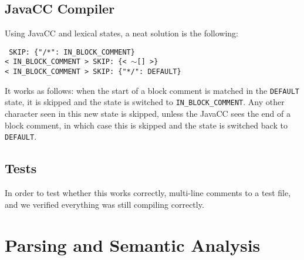 \documentclass[11pt]{article}
\begin{document}
\subsection{JavaCC Compiler}
Using JavaCC and lexical states, a neat solution is the following:

\noindent\texttt{
SKIP: \{"/*": IN\_BLOCK\_COMMENT\}\\
< IN\_BLOCK\_COMMENT > SKIP: \{< \(\sim\)[] >\}\\
< IN\_BLOCK\_COMMENT > SKIP: \{"*/": DEFAULT\}}

It works as follows: when the start of a block comment is matched in the  \texttt{DEFAULT} state, it is skipped and the state is switched to \texttt{IN\_BLOCK\_COMMENT}.
Any other character seen in this new state is skipped, unless the JavaCC sees the end of a block comment, in which case this is skipped and the state is switched back to \texttt{DEFAULT}.

\subsection{Tests}
In order to test whether this works correctly, multi-line comments to a test file, and we verified everything was still compiling correctly.

\section{Parsing and Semantic Analysis}
\end{document}
